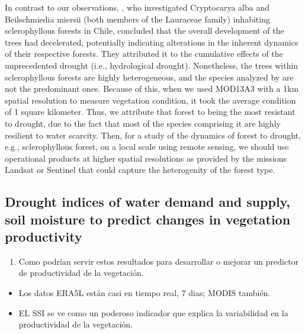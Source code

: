 \documentclass[
  number,
  preprint,
  3p,
  onecolumn]{elsarticle}
\providecommand{\tightlist}{%
  \setlength{\itemsep}{0pt}\setlength{\parskip}{0pt}}\usepackage{longtable,booktabs,array}
\begin{document}
In contrast to our observations, \citep{Venegas2022}, who investigated
Cryptocarya alba and Beilschmiedia miersii (both members of the
Lauraceae family) inhabiting sclerophyllous forests in Chile, concluded
that the overall development of the trees had decelerated, potentially
indicating alterations in the inherent dynamics of their respective
forests. They attributed it to the cumulative effects of the
unprecedented drought (i.e., hydrological drought). Nonetheless, the
trees within sclerophyllous forests are highly heterogeneous, and the
species analyzed by \citep{Venegas2022} are not the predominant ones.
Because of this, when we used MOD13A3 with a 1km spatial resolution to
measure vegetation condition, it took the average condition of 1 square
kilometer. Thus, we attribute that forest to being the most resistant to
drought, due to the fact that most of the species comprising it are
highly resilient to water scarcity. Then, for a study of the dynamics of
forest to drought, e.g., sclerophyllous forest, on a local scale using
remote sensing, we should use operational products at higher spatial
resolutions as provided by the missions Landsat or Sentinel that could
capture the heterogenity of the forest type.

\hypertarget{drought-indices-of-water-demand-and-supply-soil-moisture-to-predict-changes-in-vegetation-productivity}{%
\subsection{Drought indices of water demand and supply, soil moisture to
predict changes in vegetation
productivity}\label{drought-indices-of-water-demand-and-supply-soil-moisture-to-predict-changes-in-vegetation-productivity}}

\begin{enumerate}
\def\labelenumi{\arabic{enumi}.}
\setcounter{enumi}{2}
\tightlist
\item
  Como podrían servir estos resultados para desarrollar o mejorar un
  predictor de productividad de la vegetación.
\end{enumerate}

\begin{itemize}
\tightlist
\item
  Los datos ERA5L están casi en tiempo real, 7 dias; MODIS también.
\item
  EL SSI se ve como un poderoso indicador que explica la variabilidad en
  la productividad de la vegetación.
\end{itemize}
\end{document}
